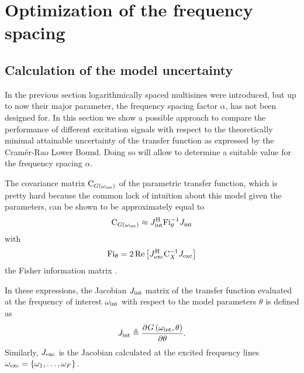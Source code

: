 \section{Optimization of the frequency spacing} \label{sec:optimAlpha}
  \subsection{Calculation of the model uncertainty}
  In the previous section logarithmically spaced multisines were introduced, but up to now their major parameter, the frequency spacing factor $\alpha$, has not been designed for.
  In this section we show a possible approach to compare the performance of different excitation signals with respect to the theoretically minimal attainable uncertainty of the transfer function as expressed by the Cramér-Rao Lower Bound.
  Doing so will allow to determine a suitable value for the frequency spacing $\alpha$.

  The covariance matrix $\mathrm{C}_{G\left(\omega_{\mathrm{int}}\right)}$ of the parametric transfer function, which is pretty hard because the common lack of intuition about this model given the parameters, can be shown \citep{Pintelon2001, Gallager2008, matrixcookbook} to be approximately equal to
  \begin{align}
    \C_{G\left( \omega_{\interest}\right) } \approx
      \InnerQuadraticForm[\HT]
                         {\jac{\interest}}
                         {\FisherInformation_{\theta}^{-1}}
     \label{eq:varPeak}
  \end{align}
  with 
  \begin{equation}
    \FisherInformation_{\theta} =
    2
    \real{
          \InnerQuadraticForm[\HT]
                              {\jac{\excited}}
                              {\C_{X}^{-1}}
          }
    \label{eq:FisherInfo}
  \end{equation}
  the Fisher information matrix \citep{Pintelon2001}.

  In these expressions, the Jacobian $J_{\mathrm{int}}$ matrix of the transfer function evaluated at the frequency of interest $\omega_{\mathrm{int}}$ with respect to the model parameters $\theta$ is defined as
  \begin{equation}
    J_{\mathrm{int}} \triangleq
         \frac{{\partial}^{} G\left( \omega_{\mathrm{int}}, \theta \right) }{\partial \theta}
    \text{.}
  \end{equation}
  Similarly, $J_{\mathrm{exc}}$ is the Jacobian calculated at the excited frequency lines $\omega_{\mathrm{exc}} = \left\{\omega_1, \ldots, \omega_F\right\}$.

